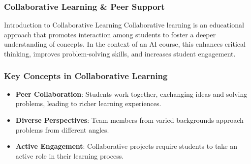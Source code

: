 \documentclass[aspectratio=169]{beamer}
\begin{document}
\begin{frame}[fragile]
    \frametitle{Collaborative Learning \& Peer Support}
    \begin{block}{Introduction to Collaborative Learning}
        Collaborative learning is an educational approach that promotes interaction among students to foster a deeper understanding of concepts. In the context of an AI course, this enhances critical thinking, improves problem-solving skills, and increases student engagement.
    \end{block}
\end{frame}

\begin{frame}[fragile]
    \frametitle{Key Concepts in Collaborative Learning}
    \begin{itemize}
        \item \textbf{Peer Collaboration}: Students work together, exchanging ideas and solving problems, leading to richer learning experiences.
        \item \textbf{Diverse Perspectives}: Team members from varied backgrounds approach problems from different angles.
        \item \textbf{Active Engagement}: Collaborative projects require students to take an active role in their learning process.
    \end{itemize}
\end{frame}
\end{document}
